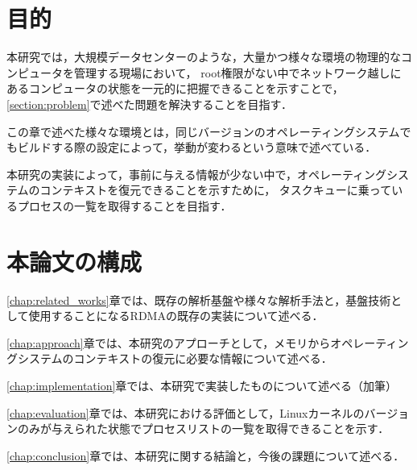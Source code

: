 \section{目的}
\label{section:purpose}

本研究では，大規模データセンターのような，大量かつ様々な環境の物理的なコンピュータを管理する現場において，
root権限がない中でネットワーク越しにあるコンピュータの状態を一元的に把握できることを示すことで，\ref{section:problem}で述べた問題を解決することを目指す．

この章で述べた様々な環境とは，同じバージョンのオペレーティングシステムでもビルドする際の設定によって，挙動が変わるという意味で述べている．

本研究の実装によって，事前に与える情報が少ない中で，オペレーティングシステムのコンテキストを復元できることを示すために，
タスクキューに乗っているプロセスの一覧を取得することを目指す．





\section{本論文の構成}

\ref{chap:related_works}章では、既存の解析基盤や様々な解析手法と，基盤技術として使用することになるRDMAの既存の実装について述べる．

\ref{chap:approach}章では、本研究のアプローチとして，メモリからオペレーティングシステムのコンテキストの復元に必要な情報について述べる．

\ref{chap:implementation}章では、本研究で実装したものについて述べる（加筆）

\ref{chap:evaluation}章では、本研究における評価として，Linuxカーネルのバージョンのみが与えられた状態でプロセスリストの一覧を取得できることを示す．

\ref{chap:conclusion}章では、本研究に関する結論と，今後の課題について述べる．
